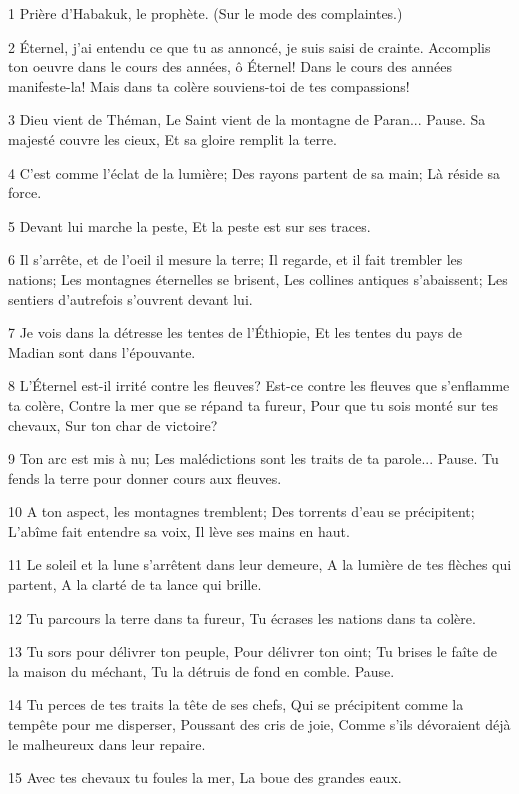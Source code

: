 \par 1 Prière d'Habakuk, le prophète. (Sur le mode des complaintes.)
\par 2 Éternel, j'ai entendu ce que tu as annoncé, je suis saisi de crainte. Accomplis ton oeuvre dans le cours des années, ô Éternel! Dans le cours des années manifeste-la! Mais dans ta colère souviens-toi de tes compassions!
\par 3 Dieu vient de Théman, Le Saint vient de la montagne de Paran... Pause. Sa majesté couvre les cieux, Et sa gloire remplit la terre.
\par 4 C'est comme l'éclat de la lumière; Des rayons partent de sa main; Là réside sa force.
\par 5 Devant lui marche la peste, Et la peste est sur ses traces.
\par 6 Il s'arrête, et de l'oeil il mesure la terre; Il regarde, et il fait trembler les nations; Les montagnes éternelles se brisent, Les collines antiques s'abaissent; Les sentiers d'autrefois s'ouvrent devant lui.
\par 7 Je vois dans la détresse les tentes de l'Éthiopie, Et les tentes du pays de Madian sont dans l'épouvante.
\par 8 L'Éternel est-il irrité contre les fleuves? Est-ce contre les fleuves que s'enflamme ta colère, Contre la mer que se répand ta fureur, Pour que tu sois monté sur tes chevaux, Sur ton char de victoire?
\par 9 Ton arc est mis à nu; Les malédictions sont les traits de ta parole... Pause. Tu fends la terre pour donner cours aux fleuves.
\par 10 A ton aspect, les montagnes tremblent; Des torrents d'eau se précipitent; L'abîme fait entendre sa voix, Il lève ses mains en haut.
\par 11 Le soleil et la lune s'arrêtent dans leur demeure, A la lumière de tes flèches qui partent, A la clarté de ta lance qui brille.
\par 12 Tu parcours la terre dans ta fureur, Tu écrases les nations dans ta colère.
\par 13 Tu sors pour délivrer ton peuple, Pour délivrer ton oint; Tu brises le faîte de la maison du méchant, Tu la détruis de fond en comble. Pause.
\par 14 Tu perces de tes traits la tête de ses chefs, Qui se précipitent comme la tempête pour me disperser, Poussant des cris de joie, Comme s'ils dévoraient déjà le malheureux dans leur repaire.
\par 15 Avec tes chevaux tu foules la mer, La boue des grandes eaux.
